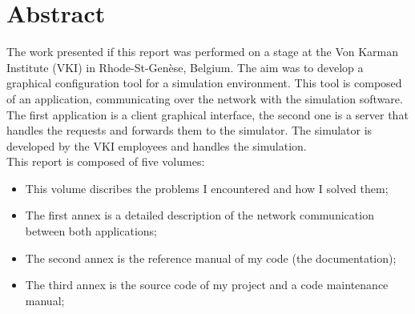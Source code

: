 \chapter*{Abstract}

The work presented if this report was performed on a stage at the Von Karman
Institute (VKI) in Rhode-St-Gen\`{e}se, Belgium. The aim was to develop a
graphical configuration tool for a simulation environment. This tool is composed
of an application, communicating over the network with the simulation software.
The first application is a client graphical interface, the second one is a
server that handles the requests and forwards them to the simulator. The
simulator is developed by the VKI employees and handles the simulation.\\

This report is composed of five volumes:

\begin{itemize}
 \item This volume discribes the problems I encountered and how I solved them;
 \item The first annex is a detailed description of the network
communication between both applications;
 \item The second annex is the reference manual of my code (the documentation);
 \item The third annex is the source code of my project and a code maintenance
manual;
\end{itemize}




